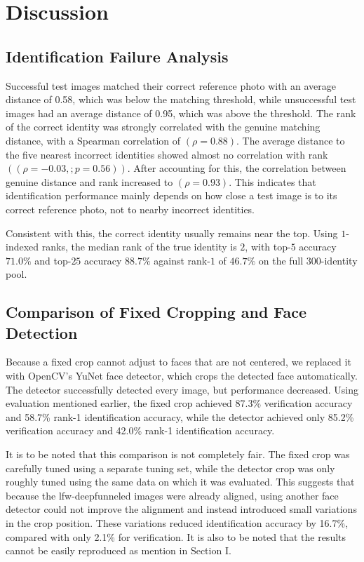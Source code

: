 \documentclass[conference]{IEEEtran}
\begin{document}
\section{Discussion}

\subsection{Identification Failure Analysis}

Successful test images matched their correct reference photo with an average distance of 0.58, which was below the matching threshold, while unsuccessful test images had an average distance of 0.95, which was above the threshold. The rank of the correct identity was strongly correlated with the genuine matching distance, with a Spearman correlation of $(\rho = 0.88)$. The average distance to the five nearest incorrect identities showed almost no correlation with rank $((\rho = -0.03,; p = 0.56))$. After accounting for this, the correlation between genuine distance and rank increased to $(\rho = 0.93)$. This indicates that identification performance mainly depends on how close a test image is to its correct reference photo, not to nearby incorrect identities.

Consistent with this, the correct identity usually remains near the top. Using
$1$-indexed ranks, the median rank of the true identity is $2$, with top-$5$
accuracy $71.0\%$ and top-$25$ accuracy $88.7\%$ against rank-$1$ of $46.7\%$ on
the full $300$-identity pool.

\subsection{Comparison of Fixed Cropping and Face Detection}
\label{sec:detector}

Because a fixed crop cannot adjust to faces that are not centered, we replaced it with OpenCV's YuNet face detector, which crops the detected face automatically. The detector successfully detected every image, but performance decreased. Using evaluation mentioned earlier, the fixed crop achieved 87.3\% verification accuracy and 58.7\% rank-1 identification accuracy, while the detector achieved only 85.2\% verification accuracy and 42.0\% rank-1 identification accuracy.

It is to be noted that this comparison is not completely fair. The fixed crop was carefully tuned using a separate tuning set, while the detector crop was only roughly tuned using the same data on which it was evaluated. This suggests that because the lfw-deepfunneled images were already aligned, using another face detector could not improve the alignment and instead introduced small variations in the crop position. These variations reduced identification accuracy by 16.7\%, compared with only 2.1\% for verification. It is also to be noted that the results cannot be easily reproduced as mention in Section I.
\end{document}
